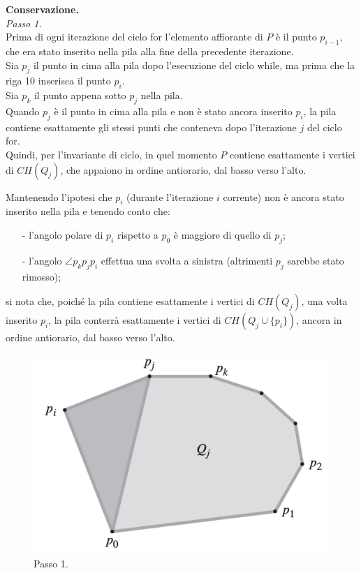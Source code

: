 \documentclass[12pt,a4paper]{report}
\begin{document}
\noindent \textbf{Conservazione.}\\
\textit{Passo 1.}\\
Prima di ogni iterazione del ciclo for l'elemento affiorante di $P$ è il punto $p_{i-1}$, che era stato inserito nella pila alla fine della precedente iterazione.\\
Sia $p_j$ il punto in cima alla pila dopo l'esecuzione del ciclo while, ma prima che la riga 10 inserisca il punto $p_i$.\\
Sia $p_k$ il punto appena sotto $p_j$ nella pila.\\
Quando $p_j$ è il punto in cima alla pila e non è stato ancora inserito $p_i$, la pila contiene esattamente gli stessi punti che conteneva dopo l'iterazione $j$ del ciclo for.\\
Quindi, per l'invariante di ciclo, in quel momento $P$ contiene esattamente i vertici di $CH(Q_j)$, che appaiono in ordine antiorario, dal basso verso l'alto.

\vspace{0.3cm}


\noindent Mantenendo l'ipotesi che $p_i$ (durante l'iterazione $i$ corrente) non è ancora stato inserito nella pila e tenendo conto che:
\begin{itemize}
    \item[-] l'angolo polare di $p_i$ rispetto a $p_0$ è maggiore di quello di $p_j$;
    \item[-] l'angolo $\angle p_kp_jp_i$ effettua una svolta a sinistra (altrimenti $p_j$ sarebbe stato rimosso);
\end{itemize}
si nota che, poiché la pila contiene esattamente i vertici di $CH(Q_j)$, una volta inserito $p_i$, la pila conterrà esattamente i vertici di $CH(Q_j \cup \{p_i\})$, ancora in ordine antiorario, dal basso verso l'alto.

\begin{figure}[ht]
    \centering
    \includegraphics[width=0.55\linewidth]{dimStep1.png}
    \caption{Passo 1.}
    \label{fig:dimStep1}
\end{figure}
\end{document}
